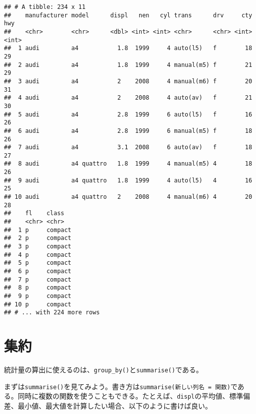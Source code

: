 \documentclass[]{book}
\newenvironment{Shaded}{\begin{snugshade}}{\end{snugshade}}
\newcommand{\KeywordTok}[1]{\textcolor[rgb]{0.13,0.29,0.53}{\textbf{#1}}}
\newcommand{\DataTypeTok}[1]{\textcolor[rgb]{0.13,0.29,0.53}{#1}}
\newcommand{\StringTok}[1]{\textcolor[rgb]{0.31,0.60,0.02}{#1}}
\newcommand{\OperatorTok}[1]{\textcolor[rgb]{0.81,0.36,0.00}{\textbf{#1}}}
\newcommand{\NormalTok}[1]{#1}
\begin{document}
\begin{verbatim}
## # A tibble: 234 x 11
##    manufacturer model      displ   nen   cyl trans      drv     cty   hwy
##    <chr>        <chr>      <dbl> <int> <int> <chr>      <chr> <int> <int>
##  1 audi         a4           1.8  1999     4 auto(l5)   f        18    29
##  2 audi         a4           1.8  1999     4 manual(m5) f        21    29
##  3 audi         a4           2    2008     4 manual(m6) f        20    31
##  4 audi         a4           2    2008     4 auto(av)   f        21    30
##  5 audi         a4           2.8  1999     6 auto(l5)   f        16    26
##  6 audi         a4           2.8  1999     6 manual(m5) f        18    26
##  7 audi         a4           3.1  2008     6 auto(av)   f        18    27
##  8 audi         a4 quattro   1.8  1999     4 manual(m5) 4        18    26
##  9 audi         a4 quattro   1.8  1999     4 auto(l5)   4        16    25
## 10 audi         a4 quattro   2    2008     4 manual(m6) 4        20    28
##    fl    class  
##    <chr> <chr>  
##  1 p     compact
##  2 p     compact
##  3 p     compact
##  4 p     compact
##  5 p     compact
##  6 p     compact
##  7 p     compact
##  8 p     compact
##  9 p     compact
## 10 p     compact
## # ... with 224 more rows
\end{verbatim}

\section{集約}

統計量の算出に使えるのは、\texttt{group\_by()}と\texttt{summarise()}である。

まずは\texttt{summarise()}を見てみよう。書き方は\texttt{summarise(新しい列名\ =\ 関数)}である。同時に複数の関数を使うこともできる。たとえば、\texttt{displ}の平均値、標準偏差、最小値、最大値を計算したい場合、以下のように書けば良い。

\begin{Shaded}
\end{Shaded}
\end{document}
